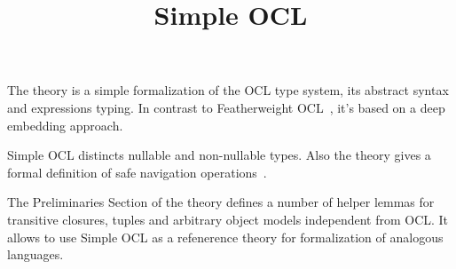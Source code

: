 \documentclass[11pt,a4paper]{book}
\makeatletter
\newenvironment{abstract}{%
  \small
  \begin{center}%
    {\bfseries \abstractname\vspace{-.5em}\vspace{\z@}}%
  \end{center}%
  \quotation}{\endquotation}
\makeatother
\begin{document}
\title{Simple OCL}
\maketitle

\begin{abstract}
  The theory is a simple formalization of the OCL type system,
  its abstract syntax and expressions typing.
  In contrast to Featherweight OCL~\cite{Featherweight_OCL-AFP},
  it's based on a deep embedding approach.

  Simple OCL distincts nullable and non-nullable types. Also
  the theory gives a formal definition of safe navigation
  operations~\cite{DBLP:conf/models/Willink15}.

  The Preliminaries Section of the theory defines a number of
  helper lemmas for transitive closures, tuples and arbitrary
  object models independent from OCL. It allows to use
  Simple OCL as a refenerence theory for formalization of
  analogous languages.
\end{abstract}

\tableofcontents





\end{document}
